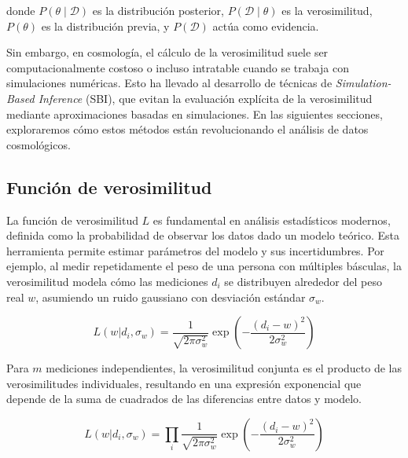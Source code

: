 \documentclass[11pt]{article}
\begin{document}
donde \( P(\theta \mid \mathcal{D}) \) es la distribución posterior, \( P(\mathcal{D} \mid \theta) \) es la verosimilitud, \( P(\theta) \) es la distribución previa, y \( P(\mathcal{D}) \) actúa como evidencia.  

Sin embargo, en cosmología, el cálculo de la verosimilitud suele ser computacionalmente costoso o incluso intratable cuando se trabaja con simulaciones numéricas. Esto ha llevado al desarrollo de técnicas de \textit{Simulation-Based Inference} (SBI), que evitan la evaluación explícita de la verosimilitud mediante aproximaciones basadas en simulaciones. En las siguientes secciones, exploraremos cómo estos métodos están revolucionando el análisis de datos cosmológicos.

\subsection{Función de verosimilitud}
La función de verosimilitud \( L \) es fundamental en análisis estadísticos modernos, definida como la probabilidad de observar los datos dado un modelo teórico. Esta herramienta permite estimar parámetros del modelo y sus incertidumbres. Por ejemplo, al medir repetidamente el peso de una persona con múltiples básculas, la verosimilitud modela cómo las mediciones \( d_i \) se distribuyen alrededor del peso real \( w \), asumiendo un ruido gaussiano con desviación estándar \( \sigma_w \).

\begin{equation}
L(w | d_i, \sigma_w) = \frac{1}{\sqrt{2 \pi \sigma_w^2}} \exp \left( -\frac{(d_i - w)^2}{2 \sigma_w^2} \right)
\end{equation}

Para \( m \) mediciones independientes, la verosimilitud conjunta es el producto de las verosimilitudes individuales, resultando en una expresión exponencial que depende de la suma de cuadrados de las diferencias entre datos y modelo.

\begin{equation}
L(w | d_i, \sigma_w) = \prod_i \frac{1}{\sqrt{2 \pi \sigma_w^2}} \exp \left( -\frac{(d_i - w)^2}{2 \sigma_w^2} \right)
\end{equation}
\end{document}
